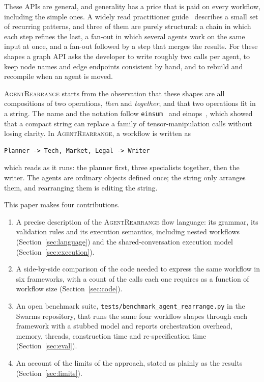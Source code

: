 \documentclass[11pt]{article}
\newcommand{\code}[1]{\texttt{#1}}
\newcommand{\AR}{\textsc{AgentRearrange}}
\begin{document}
These APIs are general, and generality has a price that is paid on every workflow, including the simple ones. A widely read practitioner guide~\cite{anthropic_agents} describes a small set of recurring patterns, and three of them are purely structural: a chain in which each step refines the last, a fan-out in which several agents work on the same input at once, and a fan-out followed by a step that merges the results. For these shapes a graph API asks the developer to write roughly two calls per agent, to keep node names and edge endpoints consistent by hand, and to rebuild and recompile when an agent is moved.

\AR{} starts from the observation that these shapes are all compositions of two operations, \emph{then} and \emph{together}, and that two operations fit in a string. The name and the notation follow \code{einsum}~\cite{numpy} and einops~\cite{einops}, which showed that a compact string can replace a family of tensor-manipulation calls without losing clarity. In \AR{}, a workflow is written as

\begin{lstlisting}[style=plain]
Planner -> Tech, Market, Legal -> Writer
\end{lstlisting}

\noindent which reads as it runs: the planner first, three specialists together, then the writer. The agents are ordinary objects defined once; the string only arranges them, and rearranging them is editing the string.

This paper makes four contributions.
\begin{enumerate}
  \item A precise description of the \AR{} flow language: its grammar, its validation rules and its execution semantics, including nested workflows (Section~\ref{sec:language}) and the shared-conversation execution model (Section~\ref{sec:execution}).
  \item A side-by-side comparison of the code needed to express the same workflow in six frameworks, with a count of the calls each one requires as a function of workflow size (Section~\ref{sec:code}).
  \item An open benchmark suite, \code{tests/benchmark\_agent\_rearrange.py} in the Swarms repository, that runs the same four workflow shapes through each framework with a stubbed model and reports orchestration overhead, memory, threads, construction time and re-specification time (Section~\ref{sec:eval}).
  \item An account of the limits of the approach, stated as plainly as the results (Section~\ref{sec:limits}).
\end{enumerate}
\end{document}
